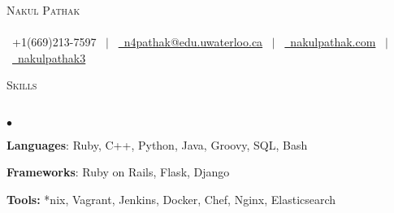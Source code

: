 \documentclass[11pt]{article}
\newcommand{\lineunder}{\vspace*{-8pt} \\ \hspace*{-18pt} \hrulefill \\}
\newcommand{\header}[1]{{\hspace*{-15pt}\vspace*{6pt} \textsc{#1}} \vspace*{-6pt} \lineunder }
\newenvironment{achievements}{\begin{list}{$\bullet$}{\topsep 0pt \itemsep -1.5pt \leftmargin 5pt}}{\vspace*{4pt}\end{list}}
\begin{document}
\small
\smallskip
\vspace*{-45pt}

\begin{center}
  {\Huge \scshape {Nakul Pathak}} \\
\hspace*{-18pt} \hrulefill \\
\vspace{1pt}
\hspace*{-13pt} \faPhone \  +1(669)213-7597 \ $|$ \  \href{mailto:n4pathak@uwaterloo.ca}{\faEnvelope \ n4pathak@edu.uwaterloo.ca} \  $|$ \  \href{http://nakulpathak.com}{\faGlobe \ nakulpathak.com}  \ $|$ \   \href{https://github.com/nakulpathak3}{\faGithub \ nakulpathak3}
\vspace{-5pt}
\end{center}

\vspace{4pt}

\header{\fontsize{12.2}{10}\selectfont Skills}
\begin{achievements}
\item \textbf{Languages}: Ruby, C++, Python, Java, Groovy, SQL, Bash
\vspace{2pt}
\item \textbf{Frameworks}: Ruby on Rails, Flask, Django
\vspace{2pt}
\item \textbf{Tools:} *nix, Vagrant, Jenkins, Docker, Chef, Nginx, Elasticsearch
\end{achievements}

\vspace{9pt}
\end{document}
